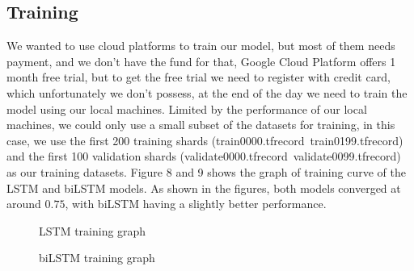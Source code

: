\documentclass{article}
\begin{document}
\subsection{Training}
We wanted to use cloud platforms to train our model, but most of them needs payment, and we don't have the fund for that, Google Cloud Platform offers 1 month free trial, but to get the free trial we need to register with credit card, which unfortunately we don't possess, at the end of the day we need to train the model using our local machines. Limited by the performance of our local machines, we could only use a small subset of the datasets for training, in this case, we use the first 200 training shards (train0000.tfrecord~train0199.tfrecord) and the first 100 validation shards (validate0000.tfrecord~validate0099.tfrecord) as our training datasets. Figure 8 and 9 shows the graph of training curve of the LSTM and biLSTM models. As shown in the figures, both models converged at around $0.75$, with biLSTM having a slightly better performance.

\begin{figure}
  \centering
  \caption{LSTM training graph}
\end{figure}

\begin{figure}
  \centering
  \caption{biLSTM training graph}
\end{figure}
\end{document}

